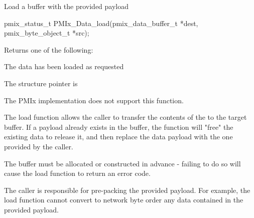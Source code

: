 \summary

Load a buffer with the provided payload

\format

\cspecificstart
\begin{codepar}
pmix_status_t
PMIx_Data_load(pmix_data_buffer_t *dest,
               pmix_byte_object_t *src);
\end{codepar}
\cspecificend

\begin{arglist}
\end{arglist}

Returns one of the following:
\begin{constantdesc}
\item {} The data has been loaded as requested
\item {} The  structure pointer is 
\item {} The \ac{PMIx} implementation does not support this function.
\end{constantdesc}

\descr

The load function allows the caller to transfer the contents of the 
 to the  target buffer. If a payload
already exists in the buffer, the function will "free" the existing data to
release it, and then replace the data payload with the one provided
by the caller.

\adviceuserstart
The buffer must be allocated or constructed in advance - failing to do so
will cause the load function to return an error code.

The caller is responsible for pre-packing the provided
payload. For example, the load function cannot convert to network byte order
any data contained in the provided payload.
\adviceuserend


\subsection{}

\summary

